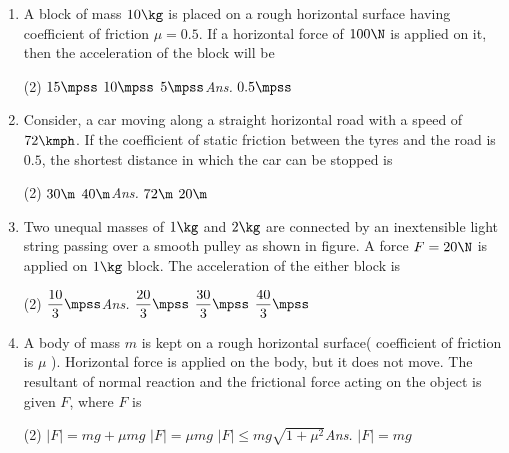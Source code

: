 \documentclass{article}
\newcommand{\ans}{\textcolor{red!95}{\textit{\quad Ans.}}}
\begin{document}
\begin{enumerate}
\item A block of mass $10\kg$ is placed on a rough horizontal surface having coefficient of friction $\mu = 0.5$. If a horizontal force of $100\N$ is applied on it, then the acceleration of the block will be
\begin{tasks}(2)
	\task $15\mpss$
	\task $10\mpss$
	\task $5\mpss$\ans
	\task $0.5\mpss$
\end{tasks}

\item Consider, a car moving along a straight horizontal road with a speed of $72\kmph$. If the coefficient of static friction between the tyres and the road is $0.5$, the shortest distance in which the car can be stopped is
\begin{tasks}(2)
	\task $30\m$
	\task $40\m$\ans
	\task $72\m$
	\task $20\m$
\end{tasks}

\item Two unequal masses of $1 \kg$ and $2 \kg$ are connected by an inextensible light string passing over a smooth pulley as shown in figure. A force $F = 20 \N$ is applied on $1 \kg$ block. The acceleration of the either block is 
\begin{center}
\end{center} 
\begin{tasks}(2)
	\task $\dfrac{10}{3}\mpss$\ans
	\task $\dfrac{20}{3}\mpss$
	\task $\dfrac{30}{3}\mpss$
	\task $\dfrac{40}{3}\mpss$
\end{tasks}

\item A body of mass $m$ is kept on a rough horizontal surface( coefficient of friction is $\mu$ ). Horizontal force is applied on the body, but it does not move. The resultant of normal reaction and the frictional force acting on the object is given $F$, where $F$ is
\begin{tasks}(2)
	\task $|F|=mg+\mu mg$
	\task $|F|=\mu mg$
	\task $|F|\leq mg\sqrt{1+\mu^2}$\ans
	\task $|F|=mg$
\end{tasks}


\end{enumerate}
\end{document}
